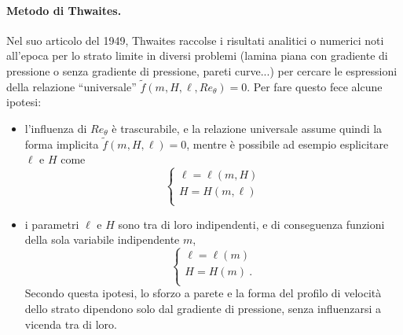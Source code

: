 \paragraph{Metodo di Thwaites.}
Nel suo articolo del 1949, Thwaites raccolse i risultati analitici o numerici noti all'epoca per lo strato limite in diversi problemi (lamina piana con gradiente di pressione o senza gradiente di pressione, pareti curve...) per cercare le espressioni della relazione ``universale'' $\tilde{f}(m, H, \ell, Re_{\theta}) = 0$. Per fare questo fece alcune ipotesi:
\begin{itemize}
 \item l'influenza di $Re_{\theta}$ è trascurabile, e la relazione universale assume quindi la forma implicita $\tilde{f}(m,H,\ell) = 0$, mentre è possibile ad esempio esplicitare $\ell$ e $H$ come
 \begin{equation}
  \begin{cases}
   \ell = \ell(m, H) \\
   H    = H(m, \ell) \\
  \end{cases}
 \end{equation}
\item i parametri $\ell$ e $H$ sono tra di loro indipendenti, e di conseguenza funzioni della sola variabile indipendente $m$,
 \begin{equation}
  \begin{cases}
   \ell = \ell(m) \\
   H    =    H(m) \ . \\
  \end{cases}
 \end{equation}
 Secondo questa ipotesi, lo sforzo a parete e la forma del profilo di velocità dello strato dipendono solo dal gradiente di pressione, senza influenzarsi a vicenda tra di loro.
\end{itemize}


